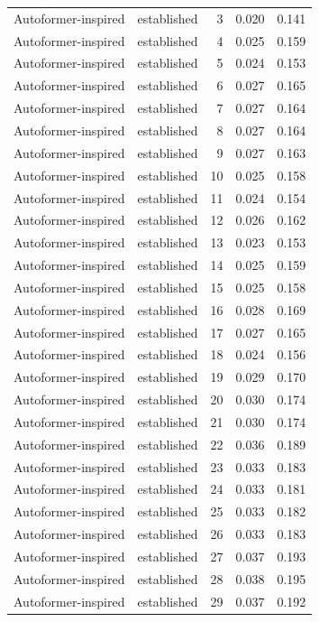 \begin{tabular}{llrrr}
Autoformer-inspired & established & 3 & 0.020 & 0.141 \\
Autoformer-inspired & established & 4 & 0.025 & 0.159 \\
Autoformer-inspired & established & 5 & 0.024 & 0.153 \\
Autoformer-inspired & established & 6 & 0.027 & 0.165 \\
Autoformer-inspired & established & 7 & 0.027 & 0.164 \\
Autoformer-inspired & established & 8 & 0.027 & 0.164 \\
Autoformer-inspired & established & 9 & 0.027 & 0.163 \\
Autoformer-inspired & established & 10 & 0.025 & 0.158 \\
Autoformer-inspired & established & 11 & 0.024 & 0.154 \\
Autoformer-inspired & established & 12 & 0.026 & 0.162 \\
Autoformer-inspired & established & 13 & 0.023 & 0.153 \\
Autoformer-inspired & established & 14 & 0.025 & 0.159 \\
Autoformer-inspired & established & 15 & 0.025 & 0.158 \\
Autoformer-inspired & established & 16 & 0.028 & 0.169 \\
Autoformer-inspired & established & 17 & 0.027 & 0.165 \\
Autoformer-inspired & established & 18 & 0.024 & 0.156 \\
Autoformer-inspired & established & 19 & 0.029 & 0.170 \\
Autoformer-inspired & established & 20 & 0.030 & 0.174 \\
Autoformer-inspired & established & 21 & 0.030 & 0.174 \\
Autoformer-inspired & established & 22 & 0.036 & 0.189 \\
Autoformer-inspired & established & 23 & 0.033 & 0.183 \\
Autoformer-inspired & established & 24 & 0.033 & 0.181 \\
Autoformer-inspired & established & 25 & 0.033 & 0.182 \\
Autoformer-inspired & established & 26 & 0.033 & 0.183 \\
Autoformer-inspired & established & 27 & 0.037 & 0.193 \\
Autoformer-inspired & established & 28 & 0.038 & 0.195 \\
Autoformer-inspired & established & 29 & 0.037 & 0.192 \\

\end{tabular}

